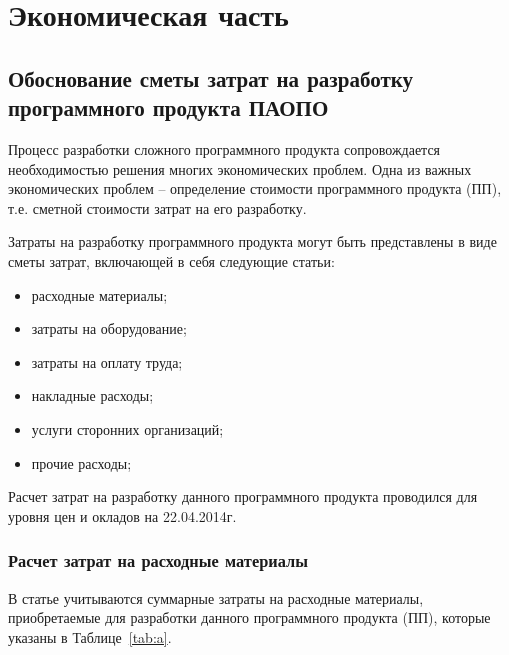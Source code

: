 \newpage

\section{Экономическая часть}
\subsection{Обоснование сметы  затрат на разработку программного продукта ПАОПО}

Процесс разработки сложного программного продукта сопровождается необходимостью решения многих экономических проблем. Одна из важных экономических проблем – определение стоимости программного продукта (ПП), т.е.  сметной стоимости затрат  на его разработку.

Затраты на разработку программного продукта могут быть представлены в виде сметы затрат, включающей в себя следующие статьи:
\begin{itemize}
	\item расходные материалы;
	\item затраты на оборудование;
	\item затраты на оплату труда;
	\item накладные расходы;
	\item услуги сторонних организаций;
	\item прочие расходы;
\end{itemize}

Расчет затрат на разработку данного программного продукта проводился для уровня цен и окладов на 22.04.2014г.

\subsubsection{Расчет затрат на расходные материалы}

   В статье учитываются суммарные затраты на расходные материалы, приобретаемые для разработки данного программного продукта (ПП), которые указаны в Таблице~\ref{tab:a}.
 
